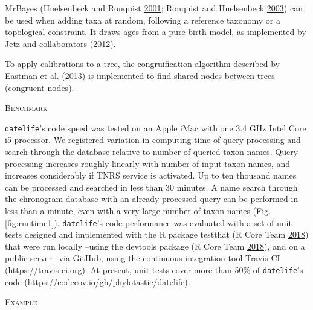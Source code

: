 \documentclass[]{article}
\begin{document}
MrBayes (Huelsenbeck and Ronquist \protect\hyperlink{ref-Huelsenbeck2001}{2001}; Ronquist and Huelsenbeck \protect\hyperlink{ref-Ronquist2003}{2003}) can be used when adding taxa at
random, following a reference taxonomy or a topological constraint. It draws ages
from a pure birth model, as implemented by Jetz and collaborators (\protect\hyperlink{ref-Jetz2012}{2012}).

To apply calibrations to a tree, the congruification algorithm described by Eastman et al. (\protect\hyperlink{ref-Eastman2013}{2013})
is implemented to find shared nodes between trees (congruent nodes).

\begin{center}
\textsc{Benchmark}
\end{center}

\texttt{datelife}'s code speed was tested on an Apple iMac
with one 3.4 GHz Intel Core i5 processor.
We registered variation in computing time of query processing and search through the database relative to number of queried taxon names.
Query processing increases roughly linearly with number of input taxon names, and
increases considerably if TNRS service is activated. Up to ten thousand names can be processed and searched in less than 30 minutes. A name search through the chronogram database with an already processed query can be performed in less than a minute, even with a very large number of taxon names (Fig. \ref{fig:runtime1}).
\texttt{datelife}'s code performance was evaluated with a set of unit tests designed and
implemented with the R package testthat (R Core Team \protect\hyperlink{ref-RCoreTeam2018}{2018}) that were run locally
--using the devtools package (R Core Team \protect\hyperlink{ref-RCoreTeam2018}{2018}), and on a public server --via
GitHub, using the continuous integration tool Travis CI (\url{https://travis-ci.org}). At
present, unit tests cover more than 50\% of \texttt{datelife}'s code (\url{https://codecov.io/gh/phylotastic/datelife}).

\begin{center}
\textsc{Example}
\end{center}
\end{document}
